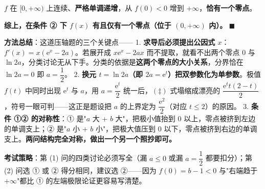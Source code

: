 $f$ 在 $[0,+\infty)$ 上连续、\textbf{严格单调递增}，从 $f(0)<0$ 增到 $+\infty$，\textbf{恰有一个零点}。

\textbf{综上，在条件 ② 下 $f(x)$ 有且仅有一个零点（位于 $(0,+\infty)$ 内）。} $\blacksquare$


\begin{gktip}
\textbf{方法总结}：这道压轴题的三个关键点——
1. \textbf{求导后必须提出公因式 $x$}：$f'(x)=x\left(\mathrm e^{x}-2a\right)$。若展开成 $x\mathrm e^{x}-2ax$ 而不提取，就看不出两个零点 $0$ 与 $\ln2a$，分类讨论无从下手。分类的依据是\textbf{这两个零点的大小关系}，分界恰在 $\ln2a=0$ 即 $a=\dfrac12$。
2. \textbf{换元 $t=\ln2a$（即 $2a=\mathrm e^{t}$）把双参数化为单参数}。极值 $f(t)$ 中同时出现 $\mathrm e^{t}$ 与 $a$，用 $a=\dfrac{\mathrm e^{t}}2$ 统一后，$(\ddagger)$ 式塌缩成漂亮的 $\dfrac{\mathrm e^{t}t(2-t)}2$，符号一眼可判——这正是题设把 $a$ 的上界定为 $\dfrac{\mathrm e^{2}}2$（对应 $t\le2$）的原因。
3. \textbf{条件 ①② 的对称性}：① 是"$a$ 大 + $b$ 大"，把极小值抬到 $0$ 以上，零点被挤到左边的单调支上；② 是"$a$ 小 + $b$ 小"，把极大值压到 $0$ 以下，零点被挤到右边的单调支上。\textbf{两问结构完全对称，做出一个另一个照抄即可。}

\textbf{考试策略}：第 (1) 问的四类讨论必须写全（漏 $a\le0$ 或漏 $a=\dfrac12$ 都要扣分）；第 (2) 问选 ① 或 ② 得分相同，建议选 ②——因为 $f(0)=b-1<0$ 与"右端趋于 $+\infty$"都比 ① 的左端极限论证更容易写清楚。
\end{gktip}
